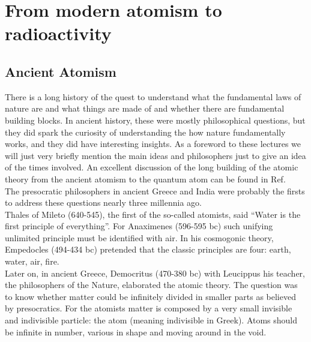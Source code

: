 %
%
%
\chapter{From modern atomism to radioactivity}
\label{Fundamentals-I} %
\section{Ancient Atomism}

There is a long history of the quest to understand what the fundamental laws of nature are and what things are made of and whether there are fundamental building blocks. In ancient history, these were mostly philosophical questions, but they did spark the curiosity of understanding the how nature fundamentally works, and they did have interesting insights. As a foreword to these lectures we will just very briefly mention the main ideas and philosophers just to give an idea of the times involved. An excellent discussion of the long building of the atomic theory from the ancient atomism to the quantum atom can be found in Ref.~\cite{atomismeantique}\\

The presocratic philosophers in ancient Greece and India were probably the firsts to address these questions nearly three millennia ago.\\
	

Thales of Mileto (640-545), the first of the so-called atomists, said ``Water is the first principle of everything''. For Anaximenes (596-595 bc) such unifying unlimited principle must be identified with air.  In his cosmogonic theory, Empedocles (494-434 bc) pretended that
the classic principles are four: earth, water, air, fire.\\

Later on, in ancient Greece, Democritus (470-380 bc) with Leucippus his teacher, the philosophers of the Nature, elaborated the
atomic theory. The question was to know whether matter could be
infinitely divided in smaller parts as believed by presocratics. For the
atomists matter is composed by a very small invisible and
indivisible particle: the atom (meaning indivisible in Greek). Atoms
should be infinite in number, various in shape and moving around in
the void.\\


